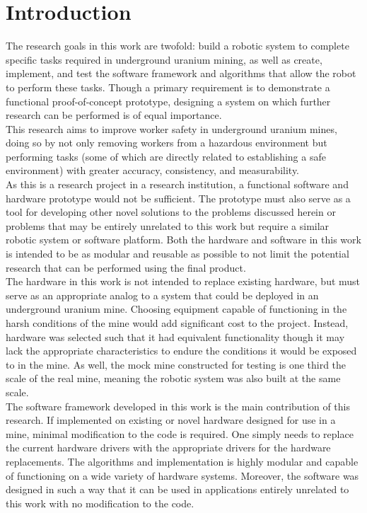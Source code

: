 \chapter{Introduction}
\label{chap:introduction}

The research goals in this work are twofold: build a robotic system to complete specific tasks required in underground uranium mining, as well as create, implement, and test the software framework and algorithms that allow the robot to perform these tasks. Though a primary requirement is to demonstrate a functional proof-of-concept prototype, designing a system on which further research can be performed is of equal importance.\\

This research aims to improve worker safety in underground uranium mines, doing so by not only removing workers from a hazardous environment but performing tasks (some of which are directly related to establishing a safe environment) with greater accuracy, consistency, and measurability.\\

As this is a research project in a research institution, a functional software and hardware prototype would not be sufficient. The prototype must also serve as a tool for developing other novel solutions to the problems discussed herein or problems that may be entirely unrelated to this work but require a similar robotic system or software platform. Both the hardware and software in this work is intended to be as modular and reusable as possible to not limit the potential research that can be performed using the final product.\\

The hardware in this work is not intended to replace existing hardware, but must serve as an appropriate analog to a system that could be deployed in an underground uranium mine. Choosing equipment capable of functioning in the harsh conditions of the mine would add significant cost to the project. Instead, hardware was selected such that it had equivalent functionality though it may lack the appropriate characteristics to endure the conditions it would be exposed to in the mine. As well, the mock mine constructed for testing is one third the scale of the real mine, meaning the robotic system was also built at the same scale.\\

The software framework developed in this work is the main contribution of this research. If implemented on existing or novel hardware designed for use in a mine, minimal modification to the code is required. One simply needs to replace the current hardware drivers with the appropriate drivers for the hardware replacements. The algorithms and implementation is highly modular and capable of functioning on a wide variety of hardware systems. Moreover, the software was designed in such a way that it can be used in applications entirely unrelated to this work with no modification to the code.\\

